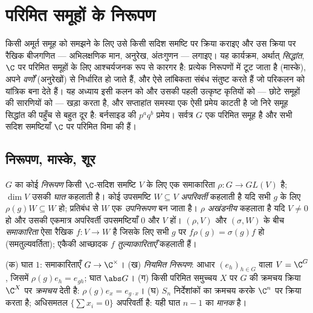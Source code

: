 \chapter{परिमित समूहों के निरूपण}\label{ch:b3:representations}

किसी अमूर्त समूह को समझने के लिए उसे किसी सदिश समष्टि पर क्रिया
कराइए और उस क्रिया पर रैखिक बीजगणित --- अभिलक्षणिक मान, अनुरेख,
अंतःगुणन --- लगाइए। यह कार्यक्रम, अर्थात् \emph{ सिद्धांत},
$\C$ पर परिमित समूहों के लिए आश्चर्यजनक रूप से कारगर है: प्रत्येक
  निरूपणों में टूट जाता है (मास्के), 
अपने \emph{वर्णों} (अनुरेखों) से निर्धारित हो जाते हैं, और 
ऐसे लांबिकता संबंध संतुष्ट करते हैं जो परिकलन को यांत्रिक बना
देते हैं। यह अध्याय इसी कलन को और उसकी पहली उत्कृष्ट कृतियों को
--- छोटे समूहों की  सारणियों को --- खड़ा करता है, और
सप्ताहांत समस्या एक ऐसी प्रमेय काटती है जो निरे समूह सिद्धांत की
पहुँच से बहुत दूर है: बर्नसाइड की $p^aq^b$ प्रमेय। सर्वत्र $G$ एक
परिमित समूह है और सभी सदिश समष्टियाँ $\C$ पर परिमित विमा की हैं।

\section{निरूपण, मास्के, शूर}

\begin{definition}\label{def:b3:representations:rep}
$G$ का कोई \emph{निरूपण} किसी $\C$-सदिश समष्टि
$V$ के लिए एक समाकारिता $\rho \colon G \to GL(V)$ है; $\dim V$ उसकी \emph{घात} कहलाती है।
कोई उपसमष्टि $W \subseteq V$ \emph{अपरिवर्ती} कहलाती है यदि सभी $g$ के लिए
$\rho(g)W \subseteq W$ हो; प्रतिबंध से $W$ एक \emph{उपनिरूपण} बन जाता है। $\rho$
\emph{अखंडनीय} कहलाता है यदि $V \neq
0$ हो और
उसकी एकमात्र अपरिवर्ती उपसमष्टियाँ $0$ और $V$ हों। $(\rho, V)$ और
$(\sigma, W)$ के बीच \emph{समाकारिता} ऐसा रैखिक $f\colon V \to W$ है जिसके लिए सभी
$g$ पर $f\rho(g) = \sigma(g)f$ हो (समतुल्यवर्तिता); एकैकी आच्छादक $f$
\emph{तुल्याकारिताएँ} कहलाती हैं।
\end{definition}

\begin{example}\label{ex:b3:representations:examples}
(क) घात $1$: समाकारिताएँ $G \to \C^\times$।
(ख) \emph{नियमित निरूपण}: आधार $(e_h)_{h \in G}$ वाला
$V = \C^G$, जिसमें $\rho(g)e_h = e_{gh}$; घात $\abs G$।
(ग) किसी परिमित समुच्चय $X$ पर $G$ की क्रमचय क्रिया $\C^X$ पर
\emph{क्रमचय } देती है: $\rho(g)e_x =
e_{g\cdot x}$।
(घ) $S_n$ निर्देशांकों का क्रमचय करके $\C^n$ पर क्रिया करता है;
अधिसमतल $\{\sum x_i = 0\}$ अपरिवर्ती है: यही घात $n - 1$ का \emph{मानक }
है।
\end{example}

